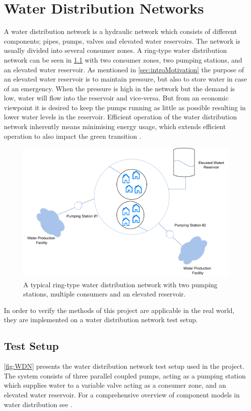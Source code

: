 \chapter{Water Distribution Networks}\label{chap:WDN}
A water distribution network is a hydraulic network which consists of different components; pipes, pumps, valves and elevated water reservoirs. The network is usually divided into several consumer zones. A ring-type water distribution network can be seen in \cref{fig:WDNintro} with two consumer zones, two pumping stations, and an elevated water reservoir. As mentioned in \cref{sec:introMotivation} the purpose of an elevated water reservoir is to maintain pressure, but also to store water in case of an emergency. When the pressure is high in the network but the demand is low, water will flow into the reservoir and vice-versa. But from an economic viewpoint it is desired to keep the pumps running as little as possible resulting in lower water levels in the reservoir. Efficient operation of the water distribution network inherently means minimising energy usage, which extends efficient operation to also impact the green transition \cite{Val2021a}.
 
 \begin{figure}[h!]
	\centering
	\includegraphics[width=0.6\linewidth]{Figures/WDNintro.pdf}
	\caption{A typical ring-type water distribution network with two pumping stations, multiple consumers and an elevated reservoir.}
	\label{fig:WDNintro}
\end{figure}

In order to verify the methods of this project are applicable in the real world, they are implemented on a water distribution network test setup.
  
\section{Test Setup}\label{sec:WDNsetup}
\cref{fig:WDN} presents the water distribution network test setup used in the project. The system consists of three parallel coupled pumps, acting as a pumping station which supplies water to a variable valve acting as a consumer zone, and an elevated water reservoir. For a comprehensive overview of component models in water distribution see \cite{Jensen}.

